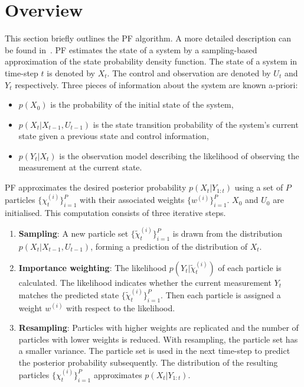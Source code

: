 \section{Overview}

This section briefly outlines the PF algorithm.
A more detailed description can be found in~\cite{doucet01}. 
PF estimates the state of a system by a sampling-based approximation of the state probability density function. 
The state of a system in time-step $t$ is denoted by $X_t$. 
The control and observation are denoted by $U_t$ and $Y_t$ respectively. 
Three pieces of information about the system are known a-priori: 
\begin{itemize}
\item $p(X_0)$ is the probability of the initial state of the system, 
\item $p(X_t|X_{t-1},U_{t-1})$ is the state transition probability of the system's current state given a previous state and control information, 
\item $p(Y_t|X_t)$ is the observation model describing the likelihood of observing the measurement at the current state.
\end{itemize}

PF approximates the desired posterior probability $p(X_{t}|Y_{1:t})$ using a set of $P$ particles $\{\chi^{(i)}_t\}^P_{i=1}$ with their associated weights $\{w^{(i)}\}^P_{i=1}$. 
$X_0$ and $U_0$ are initialised.
This computation consists of three iterative steps.

\begin{enumerate}
\item \textbf{Sampling}: A new particle set $\{\widetilde{\chi}^{(i)}_t\}^P_{i=1}$ is drawn from the distribution $p(X_t|X_{t-1},U_{t-1})$, forming a prediction of the distribution of $X_t$.
\item \textbf{Importance weighting}: The likelihood $p(Y_t|\widetilde{\chi}^{(i)}_t)$ of each particle is calculated. 
The likelihood indicates whether the current measurement $Y_t$ matches the predicted state $\{\widetilde{\chi}^{(i)}_t\}^P_{i=1}$. 
Then each particle is assigned a weight $w^{(i)}$ with respect to the likelihood.
\item \textbf{Resampling}: Particles with higher weights are replicated and the number of particles with lower weights is reduced. 
With resampling, the particle set has a smaller variance. 
The particle set is used in the next time-step to predict the posterior probability subsequently. 
The distribution of the resulting particles $\{\chi^{(i)}_t\}^P_{i=1}$ approximates $p(X_t|Y_{1:t})$.
\end{enumerate}

